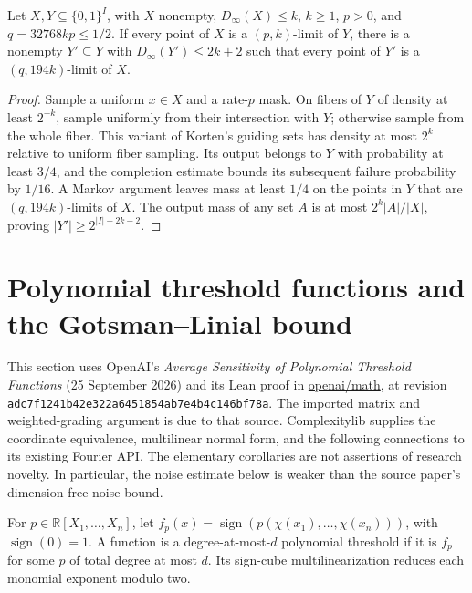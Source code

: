 \begin{lemma}
  \label{lem:analysis-improved-mirror-set}
  \leanok
  Let $X,Y\subseteq\{0,1\}^I$, with $X$ nonempty,
  $D_\infty(X)\le k$, $k\ge1$, $p>0$, and $q=32768kp\le1/2$.
  If every point of $X$ is a $(p,k)$-limit of $Y$, there is a nonempty
  $Y'\subseteq Y$ with $D_\infty(Y')\le2k+2$ such that every point of
  $Y'$ is a $(q,194k)$-limit of $X$.
\end{lemma}
\begin{proof}
  \leanok
  Sample a uniform $x\in X$ and a rate-$p$ mask. On fibers of $Y$
  of density at least $2^{-k}$, sample uniformly from their intersection
  with $Y$; otherwise sample from the whole fiber. This variant of
  Korten's guiding sets has density at most $2^k$ relative to uniform
  fiber sampling. Its output belongs to $Y$ with probability at least
  $3/4$, and the completion estimate bounds its subsequent failure
  probability by $1/16$. A Markov argument leaves mass at least $1/4$
  on the points in $Y$ that are $(q,194k)$-limits of $X$.
  The output mass of any set $A$ is at most $2^k|A|/|X|$, proving
  $|Y'|\ge2^{|I|-2k-2}$.
\end{proof}

\section{Polynomial threshold functions and the Gotsman--Linial bound}
\label{sec:analysis-polynomial-threshold}

This section uses OpenAI's \emph{Average Sensitivity of Polynomial Threshold
Functions} (25 September 2026) and its Lean proof in
\href{https://github.com/openai/math/tree/adc7f1241b42e322a6451854ab7e4b4c146bf78a/lean/OAI/Combinatorics/GotsmanLinial}{openai/math},
at revision \texttt{adc7f1241b42e322a6451854ab7e4b4c146bf78a}.
The imported matrix and weighted-grading argument is due to that source.
Complexitylib supplies the coordinate equivalence, multilinear normal form,
and the following connections to its existing Fourier API. The elementary
corollaries are not assertions of research novelty. In particular, the noise
estimate below is weaker than the source paper's dimension-free noise bound.

\begin{definition}
  \label{def:analysis-polynomial-threshold}
  \leanok
  For $p\in\mathbb R[X_1,\ldots,X_n]$, let
  $f_p(x)=\operatorname{sign}(p(\chi(x_1),\ldots,\chi(x_n)))$, with
  $\operatorname{sign}(0)=1$. A function is a degree-at-most-$d$ polynomial
  threshold if it is $f_p$ for some $p$ of total degree at most $d$.
  Its sign-cube multilinearization reduces each monomial exponent modulo two.
\end{definition}

